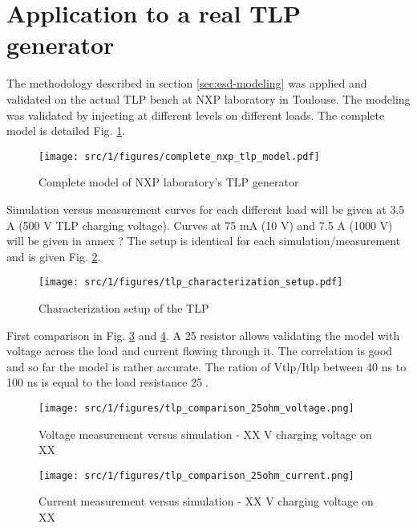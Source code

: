 \section{Application to a real TLP generator}
\label{sec:tlp-modeling}

The methodology described in section \ref{sec:esd-modeling} was applied and validated on the actual TLP bench at NXP laboratory in Toulouse.
The modeling was validated by injecting at different levels on different loads.
The complete model is detailed Fig. \ref{fig:complete-tlp-model}.


\begin{figure}[!h]
  \centering
  \texttt{[image: src/1/figures/complete\_nxp\_tlp\_model.pdf]}
  \caption{Complete model of NXP laboratory's TLP generator}
  \label{fig:complete-tlp-model}
\end{figure}

Simulation versus measurement curves for each different load will be given at 3.5 A (500 V TLP charging voltage).
Curves at 75 mA (10 V) and 7.5 A (1000 V) will be given in annex ?
The setup is identical for each simulation/measurement and is given Fig. \ref{fig:setup-cz-tlp-model}.

\begin{figure}[!h]
  \centering
  \texttt{[image: src/1/figures/tlp\_characterization\_setup.pdf]}
  \caption{Characterization setup of the TLP}
  \label{fig:setup-cz-tlp-model}
\end{figure}

First comparison in Fig. \ref{fig:comparison-tlp-1-v} and \ref{fig:comparison-tlp-1-i}.
A 25\textOmega{} resistor allows validating the model with voltage across the load and current flowing through it. The correlation is good and so far the model is rather accurate. The ration of Vtlp/Itlp between 40 ns to 100 ns is equal to the load resistance 25.


\begin{figure}[!h]
  \centering
  \texttt{[image: src/1/figures/tlp\_comparison\_25ohm\_voltage.png]}
  \caption{Voltage measurement versus simulation - XX V charging voltage on XX\textOmega{}}
  \label{fig:comparison-tlp-1-v}
\end{figure}

\begin{figure}[!h]
  \centering
  \texttt{[image: src/1/figures/tlp\_comparison\_25ohm\_current.png]}
  \caption{Current measurement versus simulation - XX V charging voltage on XX\textOmega{}}
  \label{fig:comparison-tlp-1-i}
\end{figure}

